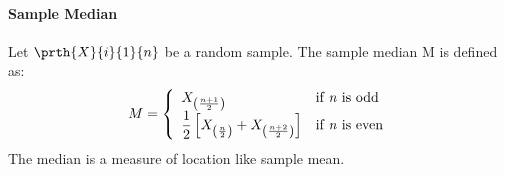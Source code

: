 \paragraph{Sample Median} Let $\prth{X}{i}{1}{n}$ be a random sample. The
sample median M is defined as:
$$
M=\left\{
\begin{array}{ll}
X_{\left(\frac{n+1}{2}\right)} & \mbox{if \emph{n} is odd}\\
\dfrac{1}{2}\left[X_{\left(\frac{n}{2}\right)} + 
X_{\left(\frac{n+2}{2}\right)}\right] & \mbox{if \emph{n} is even}
\end{array}
\right.
$$
The median is a measure of location like sample mean.
